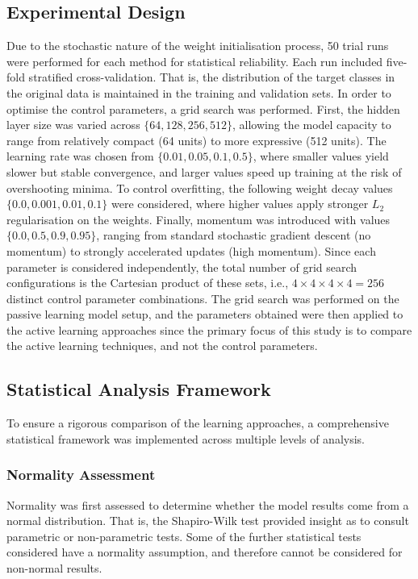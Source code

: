 \documentclass[10pt, conference]{IEEEtran}
\begin{document}
\subsection{Experimental Design}
Due to the stochastic nature of the weight initialisation process, 50 trial runs were performed for each method for statistical reliability. Each run included five-fold stratified cross-validation. That is, the distribution of the target classes in the original data is maintained in the training and validation sets. In order to optimise the control parameters, a grid search was performed. First, the hidden layer size was varied across $\{64, 128, 256, 512\}$, allowing the model capacity to range from relatively compact (64 units) to more expressive (512 units). The learning rate was chosen from  $\{0.01, 0.05, 0.1, 0.5\}$, where smaller values yield slower but stable convergence, and larger values speed up training at the risk of overshooting minima. To control overfitting, the following weight decay values $\{0.0, 0.001, 0.01, 0.1\}$ were considered, where higher values apply stronger $L_2$ regularisation on the weights. Finally, momentum was introduced with values $\{0.0, 0.5, 0.9, 0.95\}$, ranging from standard stochastic gradient descent (no momentum) to strongly accelerated updates (high momentum). Since each parameter is considered independently, the total number of grid search configurations is the Cartesian product of these sets, i.e., $4 \times 4 \times 4 \times 4 = 256$ distinct control parameter combinations. The grid search was performed on the passive learning model setup, and the parameters obtained were then applied to the active learning approaches since the primary focus of this study is to compare the active learning techniques, and not the control parameters.

\subsection{Statistical Analysis Framework}
To ensure a rigorous comparison of the learning approaches, a comprehensive statistical framework was implemented across multiple levels of analysis.
\subsubsection{Normality Assessment}
Normality was first assessed to determine whether the model results come from a normal distribution. That is, the Shapiro-Wilk test provided insight as to consult parametric or non-parametric tests. Some of the further statistical tests considered have a normality assumption, and therefore cannot be considered for non-normal results.
\end{document}
